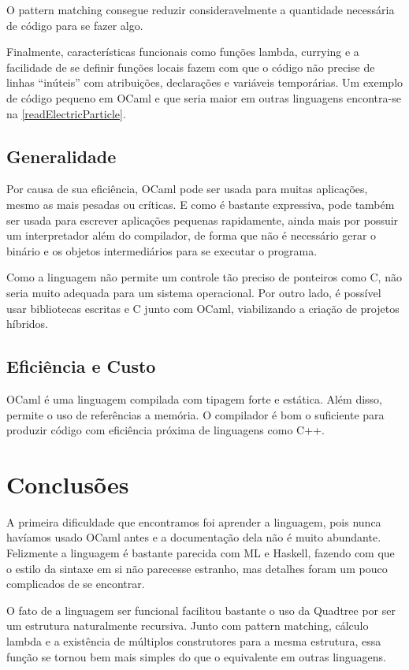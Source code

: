 \documentclass[a4paper,10pt]{article}
\begin{document}
		O pattern matching consegue reduzir consideravelmente a quantidade necessária de código para se fazer algo.
		
		Finalmente, características funcionais como funções lambda, currying e a facilidade de se definir funções locais fazem com que o código não precise de linhas ``inúteis'' com atribuições, declarações e variáveis temporárias. Um exemplo de código pequeno em OCaml e que seria maior em outras linguagens encontra-se na \autoref{readElectricParticle}.
		
	\subsection{Generalidade}
	
		Por causa de sua eficiência, OCaml pode ser usada para muitas aplicações, mesmo as mais pesadas ou críticas. E como é bastante expressiva, pode também ser usada para escrever aplicações pequenas rapidamente, ainda mais por possuir um interpretador além do compilador, de forma que não é necessário gerar o binário e os objetos intermediários para se executar o programa.
		
		Como a linguagem não permite um controle tão preciso de ponteiros como C, não seria muito adequada para um sistema operacional. Por outro lado, é possível usar bibliotecas escritas e C junto com OCaml, viabilizando a criação de projetos híbridos.
	
	\subsection{Eficiência e Custo}
	
		OCaml é uma linguagem compilada com tipagem forte e estática. Além disso, permite o uso de referências a memória. O compilador é bom o suficiente para produzir código com eficiência próxima de linguagens como C++.
	
\section{Conclusões}

	A primeira dificuldade que encontramos foi aprender a linguagem, pois nunca havíamos usado OCaml antes e a documentação dela não é muito abundante. Felizmente a linguagem é bastante parecida com ML e Haskell, fazendo com que o estilo da sintaxe em si não parecesse estranho, mas detalhes foram um pouco complicados de se encontrar.
	
	O fato de a linguagem ser funcional facilitou bastante o uso da Quadtree por ser um estrutura naturalmente recursiva. Junto com pattern matching, cálculo lambda e a existência de múltiplos construtores para a mesma estrutura, essa função se tornou bem mais simples do que o equivalente em outras linguagens.
	
\end{document}
